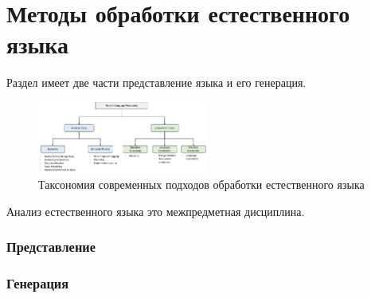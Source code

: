 \chapter{Методы обработки естественного языка}

Раздел имеет две части представление языка и его генерация.

\begin{figure}[h]
    \centering
    \includegraphics[width=0.5\textwidth]{assets/nlp/taxonomy.png}
    \caption{Таксономия современных подходов обработки естественного языка}
    \label{llm_taxonomy}
\end{figure}

Анализ естественного языка это межпредметная дисциплина.


\subsection{Представление}


\subsection{Генерация}

